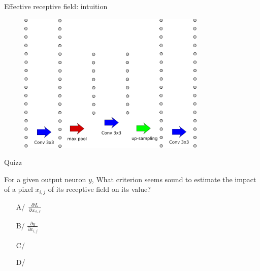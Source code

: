 \documentclass[xcolor=pdftex,dvipsnames,table,mathserif]{beamer}
\begin{document}
\begin{frame}{Effective receptive field: intuition}

  \begin{figure}
    \includegraphics[width=0.8\textwidth]{receptive_field.png}
  \end{figure}

\end{frame}


\begin{frame}{Quizz}

  \begin{block}{For a given output neuron $y$, What criterion seems sound to estimate the impact of a pixel $x_{i,j}$ of its receptive field on its value?}
    \begin{itemize}
    \item[A/] $\frac{\partial L}{\partial x_{i,j}}$
    \item[B/] $\frac{\partial y}{\partial x_{i,j}}$
    \item[C/]
    \item[D/]
    \end{itemize}

  \end{block}

\end{frame}
\end{document}
